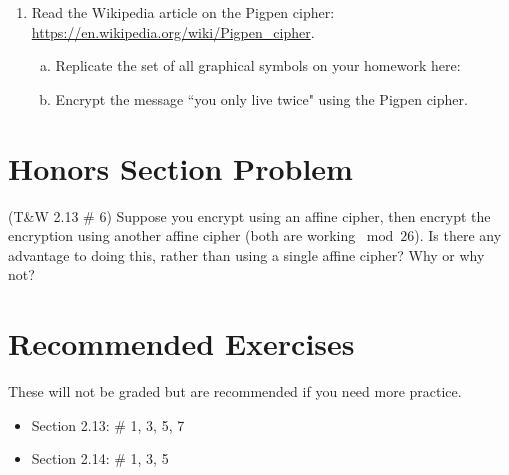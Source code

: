 \documentclass[12pt]{amsart}
\theoremstyle{plain}
\theoremstyle{definition}
\begin{document}
\begin{enumerate}[1.]
	\item Read the Wikipedia article on the Pigpen cipher:\\ \url{https://en.wikipedia.org/wiki/Pigpen_cipher}.
	\begin{enumerate}[a.]
	\item Replicate the set of all graphical symbols on your homework here:
	\begin{framed}
	\vspace{1.8in}
	\end{framed}
	\item Encrypt the message ``you only live twice" using the Pigpen cipher.
	\begin{framed}
	\vspace{2in}
	\end{framed}
	\end{enumerate}
\end{enumerate}

\section{Honors Section Problem}
 (T\&W 2.13 \# 6) Suppose you encrypt using an affine cipher, then encrypt the encryption using another affine cipher (both are working $\bmod 26$).  Is there any advantage to doing this, rather than using a single affine cipher?  Why or why not?
	\begin{framed}
	\vspace{2in}
	\end{framed}

\section{Recommended Exercises}
\noindent These will not be graded but are recommended if you need more practice.
\begin{itemize}
	\item Section 2.13: \# 1, 3, 5, 7
	\item Section 2.14: \# 1, 3, 5
\end{itemize}
	
\end{document}
